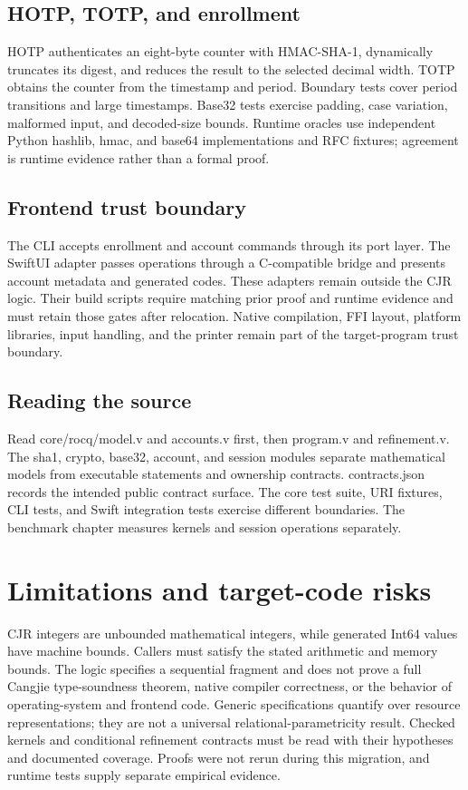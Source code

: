 \documentclass[11pt]{article}
\begin{document}
\subsection{HOTP, TOTP, and enrollment}
HOTP authenticates an eight-byte counter with HMAC-SHA-1, dynamically
truncates its digest, and reduces the result to the selected decimal width.
TOTP obtains the counter from the timestamp and period. Boundary tests cover
period transitions and large timestamps. Base32 tests exercise padding,
case variation, malformed input, and decoded-size bounds. Runtime oracles
use independent Python hashlib, hmac, and base64 implementations and RFC
fixtures; agreement is runtime evidence rather than a formal proof.
\subsection{Frontend trust boundary}
The CLI accepts enrollment and account commands through its port layer.
The SwiftUI adapter passes operations through a C-compatible bridge and
presents account metadata and generated codes. These adapters remain outside
the CJR logic. Their build scripts require matching prior proof and runtime
evidence and must retain those gates after relocation. Native compilation,
FFI layout, platform libraries, input handling, and the printer remain part
of the target-program trust boundary.
\subsection{Reading the source}
Read core/rocq/model.v and accounts.v first, then program.v and refinement.v.
The sha1, crypto, base32, account, and session modules separate mathematical
models from executable statements and ownership contracts. contracts.json
records the intended public contract surface. The core test suite, URI
fixtures, CLI tests, and Swift integration tests exercise different boundaries.
The benchmark chapter measures kernels and session operations separately.

\section{Limitations and target-code risks}
\label{sec:limitations}
CJR integers are unbounded mathematical integers, while generated Int64 values
have machine bounds. Callers must satisfy the stated arithmetic and memory
bounds. The logic specifies a sequential fragment and does not prove a full
Cangjie type-soundness theorem, native compiler correctness, or the behavior
of operating-system and frontend code. Generic specifications quantify over
resource representations; they are not a universal relational-parametricity
result. Checked kernels and conditional refinement contracts must be read
with their hypotheses and documented coverage. Proofs were not rerun during
this migration, and runtime tests supply separate empirical evidence.
\end{document}
